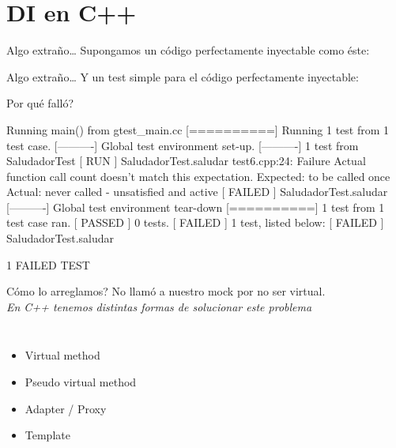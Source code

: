 \section{DI en C++}


\begin{frame}{Algo extra\~no\ldots}
Supongamos un c\'odigo perfectamente inyectable como \'este:

\end{frame}

\begin{frame}{Algo extra\~no\ldots}
Y un test simple para el c\'odigo perfectamente inyectable:

\end{frame}

\begin{frame}{\textquestiondown Por qu\'e fall\'o?}
\begin{semiverbatim}
Running main() from gtest_main.cc
{\color[rgb]{0,1,0}[==========]} Running 1 test from 1 test case.
{\color[rgb]{0,1,0}[----------]} Global test environment set-up.
{\color[rgb]{0,1,0}[----------]} 1 test from SaludadorTest
{\color[rgb]{0,1,0}[ RUN      ]} SaludadorTest.saludar
test6.cpp:24: Failure
Actual function call count doesn't match this expectation.
         Expected: to be called once
           Actual: never called - unsatisfied and active
{\color[rgb]{1,0,0}[  FAILED  ]} SaludadorTest.saludar
{\color[rgb]{0,1,0}[----------]} Global test environment tear-down
{\color[rgb]{0,1,0}[==========]} 1 test from 1 test case ran.
{\color[rgb]{0,1,0}[  PASSED  ]} 0 tests.
{\color[rgb]{1,0,0}[  FAILED  ]} 1 test, listed below:
{\color[rgb]{1,0,0}[  FAILED  ]} SaludadorTest.saludar

 1 FAILED TEST
\end{semiverbatim}
\end{frame}


\begin{frame}[t]{\textquestiondown C\'omo lo arreglamos?}
No llam\'o a nuestro mock por no ser virtual. \\
\textit{ En C++ tenemos distintas formas de solucionar este problema }

\begin{columns}[onlytextwidth]
	\begin{itemize}
		\item Virtual method
		\item Pseudo virtual method
		\item Adapter / Proxy
		\item Template
	\end{itemize}
	\begin{flushright}
	\end{flushright}
\end{columns}
\end{frame}


